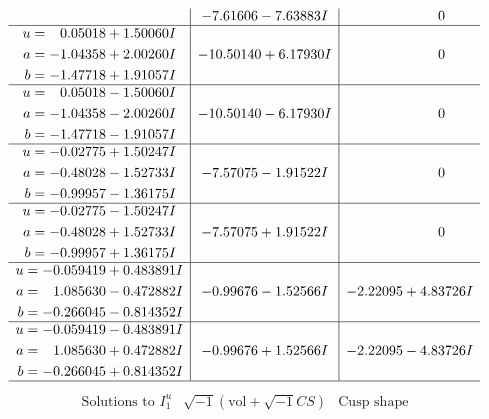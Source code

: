 \documentclass[1p]{elsarticle_modified}
\theoremstyle{definition}
\newcommand{\I}{\sqrt{-1}}
\begin{document}
$$\begin{array}{c|c|c}
 & -7.61606 - 7.63883 I & \phantom{-0.000000 } 0 \\ \hline\begin{aligned}
u &= \phantom{-}0.05018 + 1.50060 I \\
a &= -1.04358 + 2.00260 I \\
b &= -1.47718 + 1.91057 I\end{aligned}
 & -10.50140 + 6.17930 I & \phantom{-0.000000 } 0 \\ \hline\begin{aligned}
u &= \phantom{-}0.05018 - 1.50060 I \\
a &= -1.04358 - 2.00260 I \\
b &= -1.47718 - 1.91057 I\end{aligned}
 & -10.50140 - 6.17930 I & \phantom{-0.000000 } 0 \\ \hline\begin{aligned}
u &= -0.02775 + 1.50247 I \\
a &= -0.48028 - 1.52733 I \\
b &= -0.99957 - 1.36175 I\end{aligned}
 & -7.57075 - 1.91522 I & \phantom{-0.000000 } 0 \\ \hline\begin{aligned}
u &= -0.02775 - 1.50247 I \\
a &= -0.48028 + 1.52733 I \\
b &= -0.99957 + 1.36175 I\end{aligned}
 & -7.57075 + 1.91522 I & \phantom{-0.000000 } 0 \\ \hline\begin{aligned}
u &= -0.059419 + 0.483891 I \\
a &= \phantom{-}1.085630 - 0.472882 I \\
b &= -0.266045 - 0.814352 I\end{aligned}
 & -0.99676 - 1.52566 I & -2.22095 + 4.83726 I \\ \hline\begin{aligned}
u &= -0.059419 - 0.483891 I \\
a &= \phantom{-}1.085630 + 0.472882 I \\
b &= -0.266045 + 0.814352 I\end{aligned}
 & -0.99676 + 1.52566 I & -2.22095 - 4.83726 I\\
 \hline 
 \end{array}$$\newpage$$\begin{array}{c|c|c}  
\text{Solutions to }I^u_{1}& \I (\text{vol} + \sqrt{-1}CS) & \text{Cusp shape}\\

\end{array}$$
\end{document}
